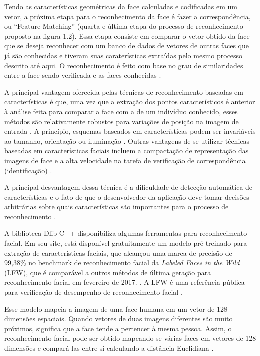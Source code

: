 Tendo as características geométricas da face calculadas e codificadas em um vetor, a próxima etapa para o reconhecimento da face é fazer a correspondência, ou “Feature Matching” (quarta e última etapa do processo de reconhecimento proposto na figura 1.2). Essa etapa consiste em comparar o vetor obtido da face que se deseja reconhecer com um banco de dados de vetores de outras faces que já são conhecidas e tiveram suas caraterísticas extraídas pelo mesmo processo descrito até aqui. O reconhecimento é feito com base no grau de similaridades entre a face sendo verificada e as faces conhecidas \cite{Quirita2014}.   

A principal vantagem oferecida pelas técnicas de reconhecimento baseadas em características é que, uma vez que a extração dos pontos característicos é anterior à análise feita para comparar a face com a de um indivíduo conhecido, esses métodos são relativamente robustos para variações de posição na imagem de entrada \cite{Jebara1996}. A princípio, esquemas baseados em características podem ser invariáveis ao tamanho, orientação ou iluminação \cite{Cox1996}. Outras vantagens de se utilizar técnicas baseadas em características faciais incluem a compactação de representação das imagens de face e a alta velocidade na tarefa de verificação de correspondência (identificação) \cite{Brunelli1992}.

A principal desvantagem dessa técnica é a dificuldade de detecção automática de características e o fato de que o desenvolvedor da aplicação deve tomar decisões arbitrárias sobre quais características são importantes para o processo de reconhecimento \cite{Cendrillon2000}.

A biblioteca Dlib C++ disponibiliza algumas ferramentas para reconhecimento facial. Em seu site, está disponível gratuitamente um modelo pré-treinado para extração de características faciais, que alcançou uma marca de precisão de 99,38\% no benchmark de reconhecimento facial da \textit{Labeled Faces in the Wild} (LFW), que é comparável a outros métodos de última geração para reconhecimento facial em fevereiro de 2017. \cite{Dlib}. A LFW é uma referência pública para verificação de desempenho de reconhecimento facial \cite{Lfw}.

Esse modelo mapeia a imagem de uma face humana em um vetor de 128 dimensões espaciais. Quando vetores de duas imagens diferentes são muito próximos, significa que a face tende a pertencer à mesma pessoa. Assim, o reconhecimento facial pode ser obtido mapeando-se várias faces em vetores de 128 dimensões e compará-las entre si calculando a distância Euclidiana \cite{Dlib}.

